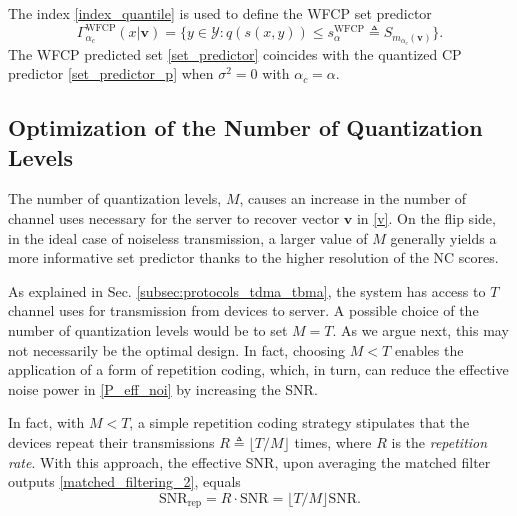 \documentclass[12pt, draftclsnofoot, onecolumn]{IEEEtran}
\begin{document}

The index \eqref{index_quantile} is used to define the WFCP set predictor
\begin{equation}\label{set_predictor}
    \Gamma_{\alpha_c}^{\text{WFCP}}(x|\boldsymbol{v}) = \{y \in \mathcal{Y}: q(s(x, y)) \leq s^{\text{WFCP}}_{\alpha} \triangleq S_{m_{\alpha_c}(\boldsymbol{v})} \}.
\end{equation}The WFCP predicted set \eqref{set_predictor} coincides with the quantized CP predictor \eqref{set_predictor_p} when $\sigma^2=0$ with $\alpha_c=\alpha$.

\subsection{Optimization of the Number of Quantization Levels}\label{opt_M}
The number of quantization levels, $M$, causes an increase in the number of channel uses necessary for the server to recover vector $\boldsymbol{v}$ in \eqref{v}. On the flip side, in the ideal case of noiseless transmission, a larger value of $M$ generally yields a more informative set predictor thanks to the higher resolution of the NC scores.

As explained in Sec. \ref{subsec:protocols_tdma_tbma}, the system has access to $T$ channel uses for transmission from devices to server. A possible choice of the number of quantization levels would be to set $M=T$. As we argue next, this may not necessarily be the optimal design. In fact, choosing $M<T$ enables the application of a form of repetition coding, which, in turn, can reduce the effective noise power in \eqref{P_eff_noi} by increasing the SNR.


In fact, with $M<T$, a simple repetition coding strategy stipulates that the devices repeat their transmissions $R\triangleq\lfloor T/M \rfloor$ times, where $R$ is the \textit{repetition rate}. With this approach, the effective SNR, upon averaging the matched filter outputs \eqref{matched_filtering_2}, equals
\begin{equation}\label{eff_SNR}
    \text{SNR}_{\text{rep}}=R \cdot\text{SNR} = \lfloor T/M \rfloor\text{SNR}.
\end{equation}
\end{document}

